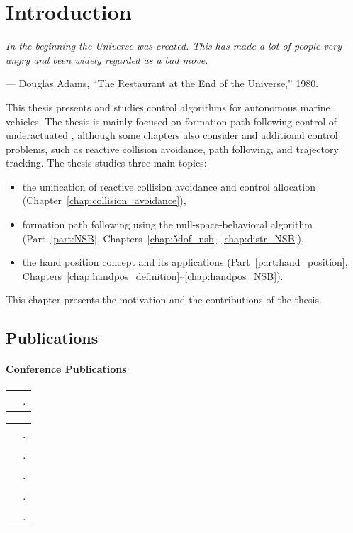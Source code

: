 \chapter{Introduction}
\label{chap:introduction}

\setlength{\epigraphwidth}{0.5\textwidth}
\epigraph{ \it
    In the beginning the Universe was created.
    This has made a lot of people very angry and been widely regarded as a bad move.
}{--- Douglas Adams, ``The Restaurant at the End of the Universe,'' 1980.}

This thesis presents and studies control algorithms for autonomous marine vehicles.
The thesis is mainly focused on formation path-following control of underactuated , although some chapters also consider  and additional control problems, such as reactive collision avoidance, path following, and trajectory tracking.
The thesis studies three main topics:
\begin{itemize}
    \item the unification of reactive collision avoidance and control allocation (Chapter~\ref{chap:collision_avoidance}),
    \item formation path following using the null-space-behavioral algorithm (Part~\ref{part:NSB}, Chapters~\ref{chap:5dof_nsb}--\ref{chap:distr_NSB}),
    \item the hand position concept and its applications (Part~\ref{part:hand_position}, Chapters~\ref{chap:handpos_definition}--\ref{chap:handpos_NSB}).
\end{itemize}
This chapter presents the motivation and the contributions of the thesis.





\vspace*{-0.25em}
\section{Publications}
\vspace*{-0.5em}
\newcommand{\tablecite}[1]{\cite{#1} & \fullcite{#1}.}

\subsubsection{Conference Publications}
\begin{tabularx}{\textwidth}{rX}
    \tablecite{matous_unifying_2021} 
\end{tabularx}
\begin{tabularx}{\textwidth}{rX}
    \tablecite{matouvs_formation_2022} \\
    \tablecite{matous_singularity_2023} \\
    \tablecite{matous_MPC_2022} \\
    \tablecite{restrepo_formation_2022} \\
    \tablecite{lie_formation_2023}
\end{tabularx}

